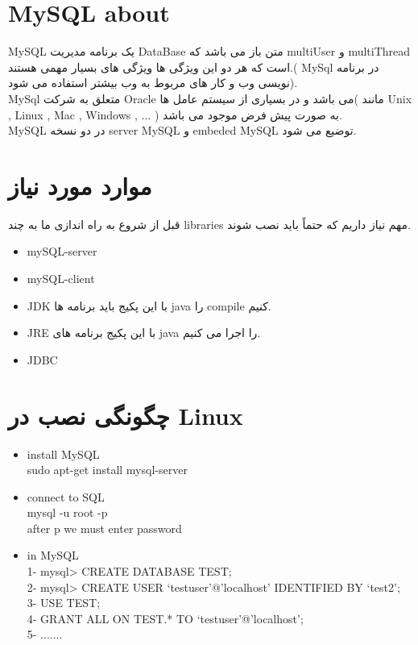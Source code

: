 \documentclass[a4paper]{article}
\begin{document}
			\section{MySQL about }
			MySQL
			یک برنامه مدیریت DataBase متن باز می باشد که multiUser و multiThread است که هر دو این ویژگی ها ویژگی های بسیار مهمی هستند.( MySql در برنامه نویسی وب و کار های مربوط به وب بیشتر استفاده می شود).\\
			MySql 
			متعلق به شرکت
			Oracle
			می باشد و در بسیاری از سیستم عامل ها( مانند
			Unix , Linux , Mac , Windows , ...
			) به صورت پیش فرض موجود می باشد.\\
			MySQL
			در دو نسخه 
			server MySQL
			و
			embeded MySQL
			توضیع می شود.\\
			
			\section{موارد مورد نیاز}
			قبل از شروع به راه اندازی ما به چند 
			libraries
			مهم نیاز داریم که حتماً باید نصب شوند.\\
			\begin{itemize}
				\item{mySQL-server}
				\item{mySQL-client}
				\item{JDK}
				با این پکیج باید برنامه ها 
				java
				را 
				compile
				کنیم.
				\item{JRE}
				با این پکیج برنامه های 
				java
				 را اجرا می کنیم.
				\item{JDBC}
			\end{itemize}
			\section{چگونگی نصب در Linux}
			\begin{latin}
				\begin{itemize}
					\item{install MySQL\\}
					sudo apt-get install mysql-server
					\item{connect to SQL\\}
					mysql -u root -p \\
					after p we must enter password
					\item{in MySQL\\}
					1- mysql>  CREATE DATABASE TEST;\\
					2- mysql>  CREATE USER ‘testuser’@’localhost’ IDENTIFIED BY ‘test2’;\\
					3- USE TEST;\\
					4- GRANT ALL ON TEST.* TO ‘testuser’@’localhost’;\\
					5- .......
				\end{itemize}
			\end{latin}
			
\end{document}
